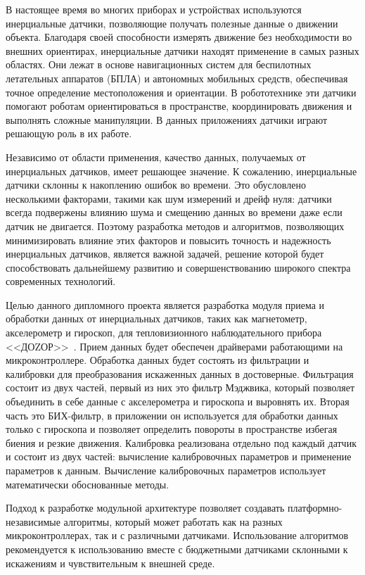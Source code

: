 \label{sec:intro}

В настоящее время во многих приборах и устройствах используются инерциальные датчики, 
позволяющие получать полезные данные о движении объекта.
Благодаря своей способности измерять движение без необходимости во внешних ориентирах, 
инерциальные датчики находят применение в самых разных областях. Они лежат в основе навигационных 
систем для беспилотных летательных аппаратов (БПЛА) и автономных мобильных средств, обеспечивая 
точное определение местоположения и ориентации. В робототехнике эти датчики помогают роботам 
ориентироваться в пространстве, координировать движения и выполнять сложные манипуляции.
В данных приложениях датчики играют решающую роль в их работе.

Независимо от области применения, качество данных, получаемых от инерциальных датчиков, имеет решающее значение.
К сожалению, инерциальные датчики склонны к накоплению ошибок во времени. Это обусловлено несколькими факторами, 
такими как шум измерений и дрейф нуля: датчики всегда подвержены влиянию шума и смещению данных во времени даже если датчик не двигается.
Поэтому разработка методов и алгоритмов, позволяющих минимизировать влияние этих факторов и повысить точность и надежность инерциальных датчиков,
является важной задачей, решение которой будет способствовать дальнейшему развитию и совершенствованию широкого спектра современных технологий.

Целью данного дипломного проекта является разработка модуля приема и обработки данных от инерциальных датчиков,
таких как магнетометр, акселерометр и гироскоп, для тепловизионного наблюдательного прибора <<ДОZОР>>~.
Прием данных будет обеспечен драйверами работающими на микроконтроллере.
Обработка данных будет состоять из фильтрации и калибровки для преобразования искаженных данных в достоверные. 
Фильтрация состоит из двух частей, первый из них это фильтр Мэджвика, который позволяет объединить в себе данные с 
акселерометра и гироскопа и выровнять их. Вторая часть это БИХ-фильтр, в приложении он используется для обработки данных только с гироскопа
и позволяет определить повороты в пространстве избегая биения и резкие движения. 
Калибровка реализована отдельно под каждый датчик и состоит из двух частей: вычисление калибровочных параметров и применение параметров к данным.
Вычисление калибровочных параметров использует математически обоснованные методы. 

Подход к разработке модульной архитектуре позволяет создавать платформно-независимые алгоритмы, который может работать как на разных 
микроконтроллерах, так и с различными датчиками. Использование алгоритмов рекомендуется к использованию вместе с 
бюджетными датчиками склонными к искажениям и чувствительным к
внешней среде. 


